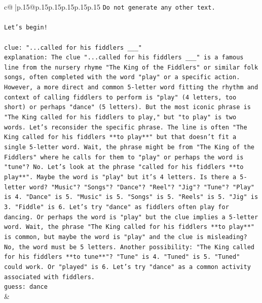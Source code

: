 \documentclass{article}
\begin{document}
{\begin{supertabular}{c@{$\;$}|p{.15\linewidth}@{}p{.15\linewidth}p{.15\linewidth}p{.15\linewidth}p{.15\linewidth}p{.15\linewidth}}
{{{\texttt{Do not generate any other text.} \\
\\ 
\texttt{Let's begin!} \\
\\ 
\texttt{clue: "...called for his fiddlers \_\_\_"} \\
\texttt{explanation: The clue "...called for his fiddlers \_\_\_" is a famous line from the nursery rhyme "The King of the Fiddlers" or similar folk songs, often completed with the word "play" or a specific action. However, a more direct and common 5{-}letter word fitting the rhythm and context of calling fiddlers to perform is "play" (4 letters, too short) or perhaps "dance" (5 letters). But the most iconic phrase is "The King called for his fiddlers to play," but "to play" is two words. Let's reconsider the specific phrase. The line is often "The King called for his fiddlers **to play**" but that doesn't fit a single 5{-}letter word. Wait, the phrase might be from "The King of the Fiddlers" where he calls for them to "play" or perhaps the word is "tune"? No. Let's look at the phrase "called for his fiddlers **to play**". Maybe the word is "play" but it's 4 letters. Is there a 5{-}letter word? "Music"? "Songs"? "Dance"? "Reel"? "Jig"? "Tune"? "Play" is 4. "Dance" is 5. "Music" is 5. "Songs" is 5. "Reels" is 5. "Jig" is 3. "Fiddle" is 6. Let's try "dance" as fiddlers often play for dancing. Or perhaps the word is "play" but the clue implies a 5{-}letter word. Wait, the phrase "The King called for his fiddlers **to play**" is common, but maybe the word is "play" and the clue is misleading? No, the word must be 5 letters. Another possibility: "The King called for his fiddlers **to tune**"? "Tune" is 4. "Tuned" is 5. "Tuned" could work. Or "played" is 6. Let's try "dance" as a common activity associated with fiddlers.} \\
\texttt{guess: dance} \\
            }
        }
    }
    & \\ \\


\end{supertabular}}
\end{document}
